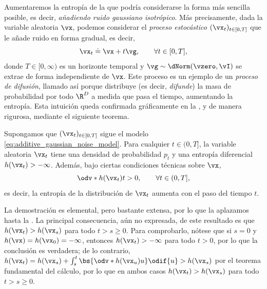 \documentclass[../../book-main.tex]{subfiles}
\begin{document}
Aumentaremos la entropía de la que podría considerarse la forma más sencilla posible,
es decir, \textit{añadiendo ruido gaussiano isotrópico}. Más precisamente, dada
la variable aleatoria \(\vx\), podemos considerar el \textit{proceso estocástico}
\((\vx_{t})_{t \in [0, T]}\) que le añade ruido en forma gradual, es decir,
\begin{equation}\label{eq:additive_gaussian_noise_model}
    \vx_{t} \doteq \vx + t\vg, \qquad \forall t \in [0, T],
\end{equation}
donde \(T \in [0, \infty)\) es un horizonte temporal y \(\vg \sim
\dNorm(\vzero, \vI)\) se extrae de forma independiente de \(\vx\). Este proceso
es un ejemplo de un \textit{proceso de difusión}, llamado así porque
distribuye (es decir, \textit{difunde}) la masa de probabilidad por todo
\(\R^{D}\) a medida que pasa el tiempo, aumentando la entropía. Esta
intuición queda confirmada gráficamente en la ,
y de manera rigurosa, mediante el siguiente teorema.
\begin{theorem}
    Supongamos que \((\vx_{t})_{t \in [0, T]}\) sigue el modelo
    \eqref{eq:additive_gaussian_noise_model}. Para cualquier \(t \in (0,
    T]\), la variable aleatoria \(\vx_{t}\) tiene una densidad de probabilidad
    \(p_{t}\) y una entropía diferencial
    \(h(\vx_{t}) > -\infty\). Además, bajo ciertas condiciones técnicas
    sobre \(\vx\),
    \begin{equation}
        \odv*{h(\vx_{t})}{t} > 0, \qquad \forall t \in (0, T],
    \end{equation}
    es decir, la entropía de la distribución de \(\vx_{t}\) aumenta
    con el paso del tiempo \(t\).
\end{theorem}
La demostración es elemental, pero bastante extensa, por lo que la aplazamos hasta
la . La principal consecuencia, aún no expresada,
de este resultado es que \(h(\vx_{t}) > h(\vx_{s})\) para todo
\(t > s \geq 0\). Para comprobarlo, nótese que si \(s = 0\) y \(h(\vx) =
h(\vx_{0}) = -\infty\), entonces \(h(\vx_{t}) > -\infty\) para todo \(t >
0\), por lo que la conclusión es verdadera; de lo contrario, \(h(\vx_{t}) = h(\vx_{s}) +
\int_{s}^{t} \bs{\odv*{h(\vx_{u})}{u}} \odif{u} > h(\vx_{s})\) por el
teorema fundamental del cálculo, por lo que en ambos casos \(h(\vx_{t}) >
h(\vx_{s})\) para todo \(t > s \geq 0\).
\end{document}
